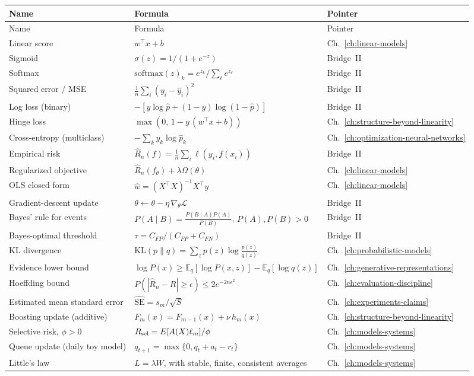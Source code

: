 \begingroup
\small
\setlength{\tabcolsep}{4pt}
\begin{longtable}{@{}L{3.25cm}L{5.15cm}L{1.75cm}@{}}
\toprule
Name & Formula & Pointer \\
\midrule
\endfirsthead
\toprule
Name & Formula & Pointer \\
\midrule
\endhead
\bottomrule
\endfoot
Linear score & $w^\top x + b$ & Ch.~\ref{ch:linear-models} \\
Sigmoid & $\sigma(z) = 1/(1+e^{-z})$ & Bridge~II \\
Softmax & $\mathrm{softmax}(z)_k = e^{z_k}/\sum_\ell e^{z_\ell}$ & Bridge~II \\
Squared error / MSE & $\frac{1}{n}\sum_i (y_i-\hat{y}_i)^2$ & Bridge~II \\
Log loss (binary) & $-[y\log \hat{p} + (1-y)\log(1-\hat{p})]$ & Bridge~II \\
Hinge loss & $\max(0,\, 1 - y\,(w^\top x + b))$ & Ch.~\ref{ch:structure-beyond-linearity} \\
Cross-entropy (multiclass) & $-\sum_k y_k \log \hat{p}_k$ & Ch.~\ref{ch:optimization-neural-networks} \\
Empirical risk & $\hat{R}_n(f) = \frac{1}{n}\sum_i \ell(y_i, f(x_i))$ & Bridge~II \\
Regularized objective & $\hat{R}_n(f_\theta) + \lambda \Omega(\theta)$ & Ch.~\ref{ch:linear-models} \\
OLS closed form & $\hat{w} = (X^\top X)^{-1} X^\top y$ & Ch.~\ref{ch:linear-models} \\
Gradient-descent update & $\theta \leftarrow \theta - \eta\,\nabla_\theta \mathcal{L}$ & Bridge~II \\
Bayes' rule for events & $P(A\mid B)=\frac{P(B\mid A)P(A)}{P(B)}$, $P(A),P(B)>0$ & Bridge~II \\
Bayes-optimal threshold & $\tau = C_{FP}/(C_{FP}+C_{FN})$ & Bridge~II \\
KL divergence & $\mathrm{KL}(p\|q) = \sum_z p(z)\log\frac{p(z)}{q(z)}$ & Ch.~\ref{ch:probabilistic-models} \\
Evidence lower bound & $\log P(x) \geq \mathbb{E}_q[\log P(x,z)] - \mathbb{E}_q[\log q(z)]$ & Ch.~\ref{ch:generative-representations} \\
Hoeffding bound & $P(|\hat{R}_n - R| \geq \epsilon) \leq 2 e^{-2 n \epsilon^2}$ & Ch.~\ref{ch:evaluation-discipline} \\
Estimated mean standard error & $\widehat{\mathrm{SE}} = s_m / \sqrt{S}$ & Ch.~\ref{ch:experiments-claims} \\
Boosting update (additive) & $F_{m}(x) = F_{m-1}(x) + \nu\,h_m(x)$ & Ch.~\ref{ch:structure-beyond-linearity} \\

Selective risk, $\phi>0$ & $R_{\rm sel}=E[A(X)\ell_m]/\phi$ & Ch.~\ref{ch:models-systems} \\
Queue update (daily toy model) & $q_{t+1}=\max\{0,q_t+a_t-r_t\}$ & Ch.~\ref{ch:models-systems} \\
Little's law & $L=\lambda W$, with stable, finite, consistent averages & Ch.~\ref{ch:models-systems} \\

\end{longtable}
\endgroup

\clearpage
{\pagestyle{empty}\cleardoublepage}
